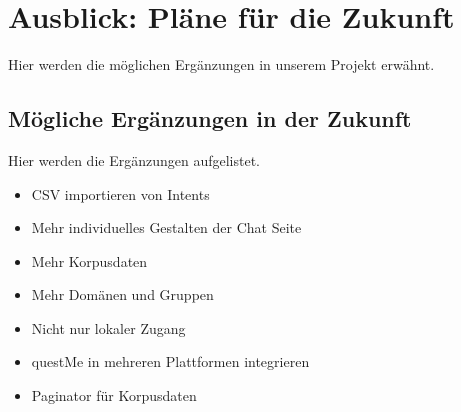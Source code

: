 \section{Ausblick: Pläne für die Zukunft}
Hier werden die möglichen Ergänzungen in unserem Projekt erwähnt.

\subsection{Mögliche Ergänzungen in der Zukunft}
Hier werden die Ergänzungen aufgelistet.

\begin{itemize}
    \item CSV importieren von Intents
    \item Mehr individuelles Gestalten der Chat Seite
    \item Mehr Korpusdaten 
    \item Mehr Domänen und Gruppen
    \item Nicht nur lokaler Zugang
    \item questMe in mehreren Plattformen integrieren
    \item Paginator für Korpusdaten
\end{itemize}